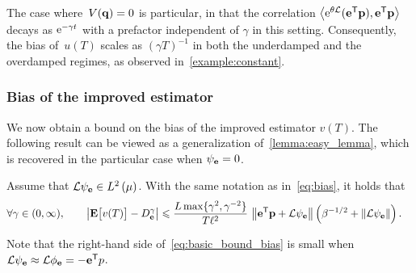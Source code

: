 \documentclass[11pt,a4paper]{article}
\begin{document}
\begin{remark}
The case where~$V(\boldsymbol{\mathbf q}) = 0$ is particular,
in that the correlation $\ip{\e^{\theta \mathcal L} (\vect e^\t \vect p)}{\vect e^\t \vect p}$ decays as $\mathrm{e}^{-\gamma t}$ with a prefactor independent of $\gamma$ in this setting.
Consequently, the bias of~$u(T)$ scales as $(\gamma T)^{-1}$ in both the underdamped and the overdamped regimes,
as observed in~\cref{example:constant}.
\end{remark}

\subsubsection{Bias of the improved estimator}%
\label{ssub:bias_of_the_improved_estimator}
We now obtain a bound on the bias of the improved estimator $v(T)$.
The following result can be viewed as a generalization of~\cref{lemma:easy_lemma},
which is recovered in the particular case when $\psi_{\boldsymbol{\mathbf e}} = 0$.
\begin{proposition}
    \label{lemma:bias_improved}
    Assume that $\mathcal L \psi_{\vect e} \in \lp{2}{\mu}$.
    With the same notation as in~\eqref{eq:bias},
    it holds that
    \begin{align}
        \label{eq:basic_bound_bias}
        \forall \gamma \in (0, \infty), \qquad
        \abs{\expect \bigl[ v(T) \bigr] - D^{\gamma}_{\vect e}}
                &\leq  \frac{L \max\{\gamma^2, \gamma^{-2}\}}{T \ell^2 }  \,  \norm{\vect e^\t \vect p + \mathcal L \psi_{\vect e}}  \left(\beta^{-1/2} + \norm{\mathcal L \psi_{\vect e}} \right).
    \end{align}
\end{proposition}
Note that the right-hand side of~\eqref{eq:basic_bound_bias} is small when $\mathcal L \psi_{\boldsymbol{\mathbf e}} \approx \mathcal L \phi_{\boldsymbol{\mathbf e}} = - \boldsymbol{\mathbf e}^\mathsf T p$.
\end{document}
